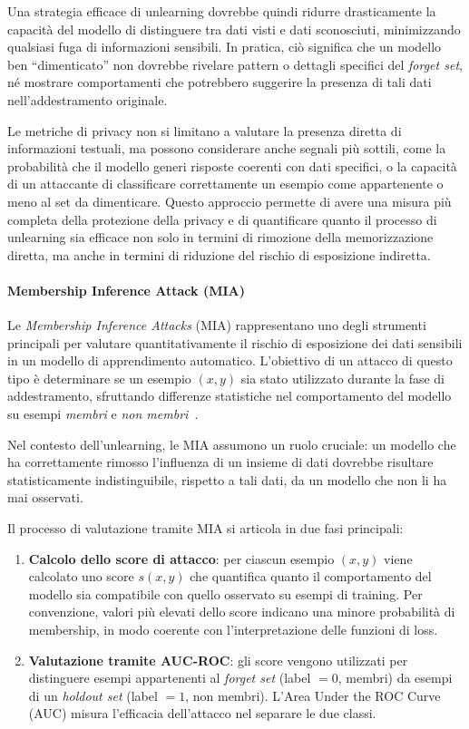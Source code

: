 Una strategia efficace di unlearning dovrebbe quindi ridurre drasticamente la capacità del modello di distinguere tra dati visti e dati sconosciuti, minimizzando qualsiasi fuga di informazioni sensibili.  
In pratica, ciò significa che un modello ben “dimenticato” non dovrebbe rivelare pattern o dettagli specifici del \textit{forget set}, né mostrare comportamenti che potrebbero suggerire la presenza di tali dati nell’addestramento originale.  

Le metriche di privacy non si limitano a valutare la presenza diretta di informazioni testuali, ma possono considerare anche segnali più sottili, come la probabilità che il modello generi risposte coerenti con dati specifici, o la capacità di un attaccante di classificare correttamente un esempio come appartenente o meno al set da dimenticare.  
Questo approccio permette di avere una misura più completa della protezione della privacy e di quantificare quanto il processo di unlearning sia efficace non solo in termini di rimozione della memorizzazione diretta, ma anche in termini di riduzione del rischio di esposizione indiretta.


\paragraph{Membership Inference Attack (MIA)}
Le \emph{Membership Inference Attacks} (MIA) rappresentano uno degli strumenti principali per valutare quantitativamente il rischio di esposizione dei dati sensibili in un modello di apprendimento automatico.  
L’obiettivo di un attacco di questo tipo è determinare se un esempio $(x, y)$ sia stato utilizzato durante la fase di addestramento, sfruttando differenze statistiche nel comportamento del modello su esempi \emph{membri} e \emph{non membri}~\cite{shokri2017membershipinferenceattacksmachine, Nasr_2019, yeom2018privacyriskmachinelearning}.  

Nel contesto dell’unlearning, le MIA assumono un ruolo cruciale: un modello che ha correttamente rimosso l’influenza di un insieme di dati dovrebbe risultare statisticamente indistinguibile, rispetto a tali dati, da un modello che non li ha mai osservati.

Il processo di valutazione tramite MIA si articola in due fasi principali:
\begin{enumerate}
    \item \textbf{Calcolo dello score di attacco}: per ciascun esempio $(x, y)$ viene calcolato uno score $s(x, y)$ che quantifica quanto il comportamento del modello sia compatibile con quello osservato su esempi di training. Per convenzione, valori più elevati dello score indicano una minore probabilità di membership, in modo coerente con l’interpretazione delle funzioni di loss.
    \item \textbf{Valutazione tramite AUC-ROC}: gli score vengono utilizzati per distinguere esempi appartenenti al \textit{forget set} (label $=0$, membri) da esempi di un \textit{holdout set} (label $=1$, non membri). L’Area Under the ROC Curve (AUC) misura l’efficacia dell’attacco nel separare le due classi.
\end{enumerate}

